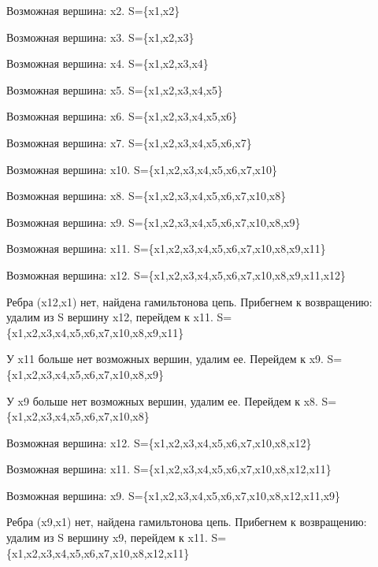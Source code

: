 \documentclass{article}
\begin{document}
Возможная вершина: x2. S=\{x1,x2\}



Возможная вершина: x3. S=\{x1,x2,x3\}



Возможная вершина: x4. S=\{x1,x2,x3,x4\}



Возможная вершина: x5. S=\{x1,x2,x3,x4,x5\}



Возможная вершина: x6. S=\{x1,x2,x3,x4,x5,x6\}



Возможная вершина: x7. S=\{x1,x2,x3,x4,x5,x6,x7\}



Возможная вершина: x10. S=\{x1,x2,x3,x4,x5,x6,x7,x10\}



Возможная вершина: x8. S=\{x1,x2,x3,x4,x5,x6,x7,x10,x8\}



Возможная вершина: x9. S=\{x1,x2,x3,x4,x5,x6,x7,x10,x8,x9\}



Возможная вершина: x11. S=\{x1,x2,x3,x4,x5,x6,x7,x10,x8,x9,x11\}



Возможная вершина: x12. S=\{x1,x2,x3,x4,x5,x6,x7,x10,x8,x9,x11,x12\}



Ребра (x12,x1) нет, найдена гамильтонова цепь. Прибегнем к возвращению: удалим из S вершину x12, перейдем к x11. S=\{x1,x2,x3,x4,x5,x6,x7,x10,x8,x9,x11\}



У x11 больше нет возможных вершин, удалим ее. Перейдем к x9. S=\{x1,x2,x3,x4,x5,x6,x7,x10,x8,x9\}



У x9 больше нет возможных вершин, удалим ее. Перейдем к x8. S=\{x1,x2,x3,x4,x5,x6,x7,x10,x8\}



Возможная вершина: x12. S=\{x1,x2,x3,x4,x5,x6,x7,x10,x8,x12\}



Возможная вершина: x11. S=\{x1,x2,x3,x4,x5,x6,x7,x10,x8,x12,x11\}



Возможная вершина: x9. S=\{x1,x2,x3,x4,x5,x6,x7,x10,x8,x12,x11,x9\}



Ребра (x9,x1) нет, найдена гамильтонова цепь. Прибегнем к возвращению: удалим из S вершину x9, перейдем к x11. S=\{x1,x2,x3,x4,x5,x6,x7,x10,x8,x12,x11\}
\end{document}
